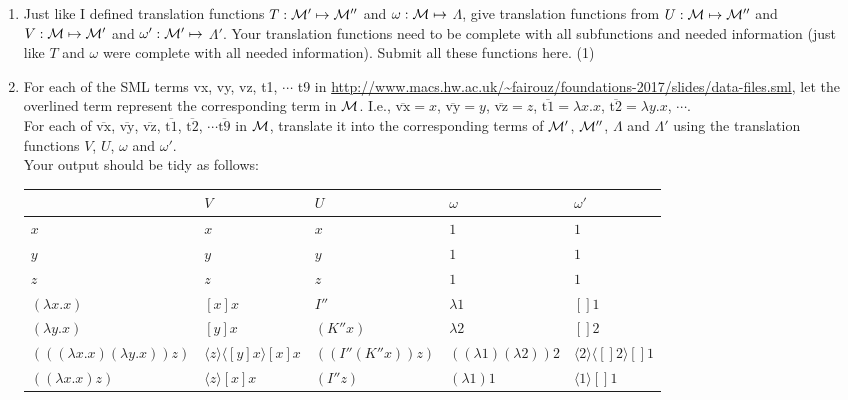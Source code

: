 \documentclass[11pt]{article}
\begin{document}
\begin{enumerate}
  

      \item
        Just like I defined translation functions  $T:{\cal M}'\mapsto {\cal M}''$ and  $\omega: {\cal M}\mapsto$ $\Lambda$, give translation functions from
        $U:{\cal M}\mapsto {\cal M}''$ and  $V:{\cal M}\mapsto{\cal M}'$ and  $\omega':{\cal M}'\mapsto$ $\Lambda'$.   Your translation functions need to be complete with all subfunctions and needed information (just like $T$ and $\omega$ were complete with all needed information).   Submit all these functions here.
        \hfill{(1)} %
    \item
      For each of the SML terms vx, vy, vz, t1, $\cdots$ t9 in \url{http://www.macs.hw.ac.uk/~fairouz/foundations-2017/slides/data-files.sml}, let the overlined term represent the corresponding term in ${\cal M}$.  I.e., $\overline{\mbox{vx}} = x$, $\overline{\mbox{vy}} = y$, $\overline{\mbox{vz}} = z$, $\overline{\mbox{t1}} = \lambda x.x$, $\overline{\mbox{t2}}
      = \lambda y.x$, $\cdots$.\\
      For each of $\overline{\mbox{vx}}$, $\overline{\mbox{vy}}$, $\overline{\mbox{vz}}$, $\overline{\mbox{t1}}$,
      $\overline{\mbox{t2}}$, $\cdots \overline{\mbox{t9}}$ in ${\cal M}$, translate it into the corresponding terms of ${\cal M}'$, ${\cal M}''$, $\Lambda$ and  $\Lambda'$ using the translation functions $V$, $U$, $\omega$ and $\omega'$.  \\
      Your output should be tidy as follows:
\begin{sideways}
      \begin{tabular}{|l|l|l|l|l|}
        \hline
        & $V$&$U$&$\omega$&$\omega'$\\
        \hline
	$x$ & $x$ & $x$ & $1$ & $1$	\\
	$y$ & $y$ & $y$ & $1$ & $1$	\\
	$z$ & $z$ & $z$ & $1$ & $1$	\\
	$(\lambda x.x)$ & $[x]x$ & $I''$ & $\lambda 1$ & $[]1$	\\
	$(\lambda y.x)$ & $[y]x$ & $(K'' x)$ & $\lambda 2$ & $[]2$	\\
	$(((\lambda x.x) (\lambda y.x)) z)$ & $\langle z\rangle \langle [y]x\rangle [x]x$ & $((I'' (K'' x)) z)$ & $((\lambda 1)(\lambda 2))2$ & $ \langle2\rangle\langle[]2\rangle[]1$	\\
	$((\lambda x.x) z)$ & $\langle z\rangle [x]x$ & $(I'' z)$ & $(\lambda 1)1$ & $\langle1\rangle[]1$	\\

\end{tabular}
\end{sideways}
\end{enumerate}
\end{document}
